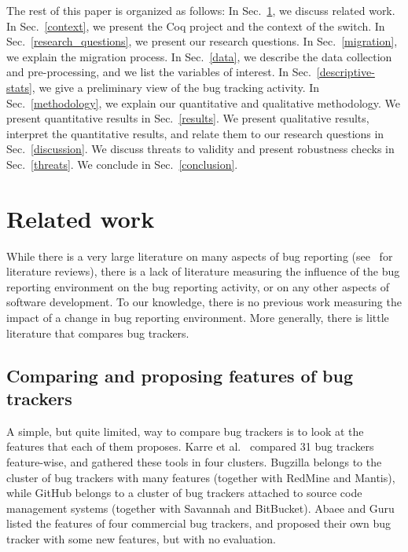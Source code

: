 \documentclass[conference]{IEEEtran}
\begin{document}
The rest of this paper is organized as follows: In Sec.~\ref{related-work}, we discuss related work. In Sec.~\ref{context}, we present the Coq project and the context of the switch. In Sec.~\ref{research_questions}, we present our research questions. In Sec.~\ref{migration}, we explain the migration process. In Sec.~\ref{data}, we describe the data collection and pre-processing, and we list the variables of interest. In Sec.~\ref{descriptive-stats}, we give a preliminary view of the bug tracking activity. In Sec.~\ref{methodology}, we explain our quantitative and qualitative methodology. We present quantitative results in Sec.~\ref{results}. We present qualitative results, interpret the quantitative results, and relate them to our research questions in Sec.~\ref{discussion}. We discuss threats to validity and present robustness checks in Sec.~\ref{threats}. We conclude in Sec.~\ref{conclusion}.

\section{Related work}

\label{related-work}

While there is a very large literature on many aspects of bug reporting (see~\cite{strate2013literature, zhang2016literature} for literature reviews), there is a lack of literature measuring the influence of the bug reporting environment on the bug reporting activity, or on any other aspects of software development. To our knowledge, there is no previous work measuring the impact of a change in bug reporting environment. More generally, there is little literature that compares bug trackers.

\subsection{Comparing and proposing features of bug trackers}

A simple, but quite limited, way to compare bug trackers is to look at the features that each of them proposes.
Karre et al.~\cite{karre2017does} compared 31 bug trackers feature-wise, and gathered these tools in four clusters. Bugzilla belongs to the cluster of bug trackers with many features (together with RedMine and Mantis), while GitHub belongs to a cluster of bug trackers attached to source code management systems (together with Savannah and BitBucket).
Abaee and Guru~\cite{abaee2010enhancement} listed the features of four commercial bug trackers, and proposed their own bug tracker with some new features, but with no evaluation.
\end{document}
